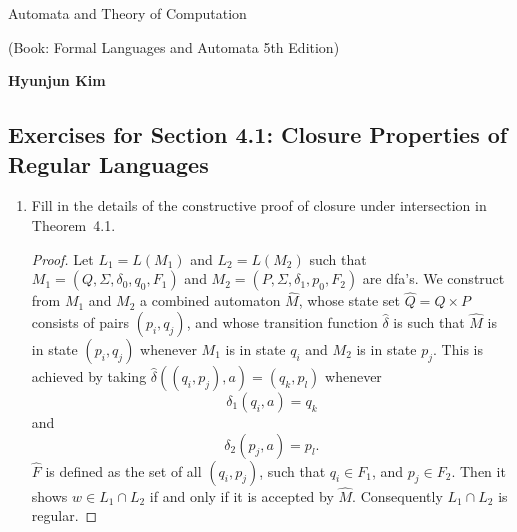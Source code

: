 \documentclass[]{article}
\theoremstyle{definition}
\begin{document}
\begin{center}
{\Large Automata and Theory of Computation} \par
(Book: Formal Languages and Automata 5th Edition) \par
\textbf{Hyunjun Kim}
\end{center}

\subsection*{Exercises for Section 4.1: Closure Properties of Regular Languages}

\begin{enumerate}
\item
    Fill in the details of the constructive proof of closure under intersection in Theorem~4.1.
\begin{proof}
    Let $L_1 = L(M_1)$ and $L_2 = L(M_2)$ such that $M_1 = (Q, \Sigma, \delta_0, q_0, F_1)$ and
    $M_2 = (P, \Sigma, \delta_1, p_0, F_2)$ are dfa's. We construct from $M_1$ and $M_2$
    a combined automaton $\hat{M}$, whose state set $\hat{Q} = Q \times P$ consists of
    pairs $(p_i, q_j)$, and whose transition function $\hat{\delta}$ is such that
    $\hat{M}$ is in state $(p_i, q_j)$ whenever $M_1$ is in state $q_i$ and $M_2$ is
    in state $p_j$. This is achieved by taking 
        $\hat{\delta}((q_i, p_j), a) = (q_k, p_l)$
    whenever
        $$\delta_1(q_i, a) = q_k$$
    and
        $$\delta_2(p_j, a) = p_l.$$
    $\hat{F}$ is defined as the set of all $(q_i, p_j)$, such that $q_i \in F_1$,
    and $p_j \in F_2$. Then it shows $w \in L_1 \cap L_2$ if and only if it is accepted by $\hat{M}$.
    Consequently $L_1 \cap L_2$ is regular.
\end{proof}


\end{enumerate}
\end{document}
